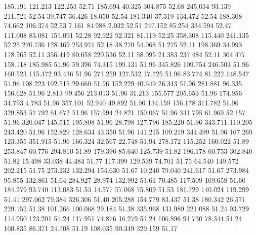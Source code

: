  185.191  121.213  122.253        52.71
 185.694   40.325  304.875        52.68
 245.034   93.139  211.721        52.54
  39.747   36.426   18.050        52.54
 181.340   37.319  134.472        52.54
 188.308   74.662  106.374        52.53
   7.161   84.988    2.032        52.51
 247.152   85.254  334.594        52.47
 111.008   83.081  151.091        52.28
  92.922   92.321   81.119        52.25
 358.308  115.440  241.135        52.25
 270.736  128.469  253.971        52.18
  38.270   54.068   51.275        52.11
 198.369   34.993  118.565        52.11
 356.419   80.058  220.536        52.11
  58.095   21.383  237.484        52.11
 304.477  158.118  185.985        51.96
  59.396   74.315  199.131        51.96
 345.826  109.754  246.503        51.96
 160.523  115.472   93.436        51.96
 271.259  127.532   17.725        51.96
  83.774   81.222  148.547        51.96
 108.223  102.515   29.660        51.96
 152.229   40.649   26.343        51.96
 281.881   96.335  156.628        51.96
   2.813   99.456  213.013        51.96
  31.213  155.577  205.653        51.96
 174.956   34.793    4.783        51.96
 357.101   52.940   49.892        51.96
 134.159  156.178  311.782        51.96
 329.853   57.792   61.672        51.96
 157.994   24.821  150.067        51.96
 341.795   61.969   52.157        51.96
 320.047  145.515  195.808        51.96
  28.798  127.796  185.220        51.96
 343.711  110.205  243.420        51.96
 152.829  128.634   43.350        51.96
 141.215  109.219  344.499        51.96
 167.269  123.355  351.915        51.96
 166.324   32.567   22.748        51.94
 278.172  115.252  160.022        51.89
 253.847   60.776  294.810        51.89
 179.396   85.640  125.739        51.82
 196.178   60.753  302.840        51.82
  15.498   33.038   44.484        51.77
 117.399  129.539   74.701        51.75
  64.540  149.572  202.215        51.75
 273.232  132.294  154.630        51.67
  10.240   79.040  241.617        51.67
 273.984   95.855  132.861        51.64
 284.927   28.974  132.992        51.61
  70.485  117.509  169.658        51.60
 184.279   93.740  113.083        51.53
  14.577   57.068   75.809        51.53
 181.729  140.024  119.299        51.41
 297.062   79.384  326.306        51.40
 205.288  154.779   83.437        51.38
 180.342   26.571  229.152        51.38
 101.266  100.068   29.184        51.38
 335.968  131.989  221.088        51.24
  93.729  114.950  123.201        51.24
 117.951   74.876   16.279        51.24
 106.896   91.730   78.344        51.24
 100.835   86.371   24.708        51.19
 108.035   90.349  329.159        51.17

